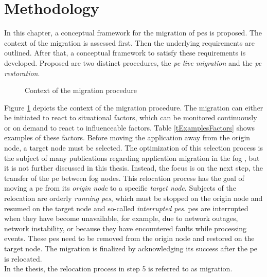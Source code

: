 \section{Methodology}
\label{lMethodology}

In this chapter, a conceptual framework for the migration of \gls{pe}s is proposed. The context of the migration is assessed first. Then the underlying requirements are outlined. After that, a conceptual framework to satisfy these requirements is developed. Proposed are two distinct procedures, the \textit{\acrshort{pe} live migration} and the \textit{\acrshort{pe} restoration}.\par

\begin{figure}[!ht]
\graphicspath{{./figures/code/}}

\caption{Context of the migration procedure}
\label{fMigrationContext}
\end{figure}

Figure \ref{fMigrationContext} depicts the context of the migration procedure. The migration can either be initiated to react to situational factors, which can be monitored continuously or on demand to react to influenceable factors. Table \ref{tExamplesFactors} shows examples of these factors. Before moving the application away from the origin node, a target node must be selected. The optimization of this selection process is the subject of many publications regarding application migration in the fog \cite{Goncalves.2018, Yao.2015, Puliafito.2018, Saurez.2016}, but it is not further discussed in this thesis. Instead, the focus is on the next step, the transfer of the \gls{pe} between fog nodes. This relocation process has the goal of moving a \gls{pe} from its \textit{origin node} to a specific \textit{target node}. Subjects of the relocation are orderly \textit{running \gls{pe}s}, which must be stopped on the origin node and resumed on the target node and so-called \textit{interrupted \gls{pe}s}. \gls{pe}s are interrupted when they have become unavailable, for example, due to network outages, network instability, or because they have encountered faults while processing events. These \gls{pe}s need to be removed from the origin node and restored on the target node. The migration is finalized by acknowledging its success after the \gls{pe} is relocated.\\
In the thesis, the relocation process in step 5 is referred to as migration.\par


